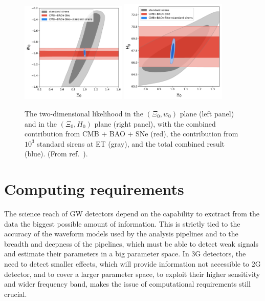 \begin{figure}[t]
\includegraphics[width=0.45\textwidth]{Figures/xi0_w0.pdf}
\includegraphics[width=0.45\textwidth]{Figures/xi0_H0.pdf}
\caption{The  two-dimensional likelihood in the $(\Xi_0,w_0)$ plane (left panel) and in the $(\Xi_0,H_0)$ plane (right panel), with the combined  contribution from 
CMB + BAO + SNe (red), the contribution from  $10^3$ standard sirens at ET (gray), and the total combined result (blue). (From ref.~\cite{Belgacem:2018lbp}).
\label{fig:xi0w0}}
\end{figure}

   

\section{Computing requirements}\label{compu}
The science reach of GW detectors depend on the capability to exctract from the data the biggest possible amount of information. This is strictly tied to the accuracy of the waveform models used by the analysis pipelines and to the breadth and deepness of the pipelines, which must be able to detect weak signals and estimate their parameters in a big parameter space.   
In 3G detectors, the need to detect smaller effects, which will provide information not accessible to 2G detector, and to cover a larger parameter space, to exploit their higher sensitivity and wider frequency band, makes the issue of computational requirements still crucial. 

